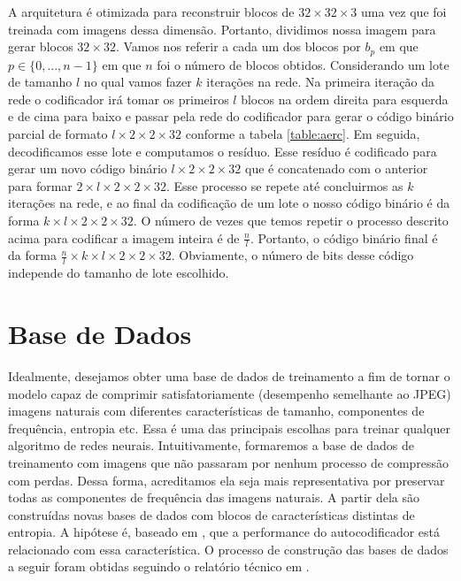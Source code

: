 A arquitetura é otimizada para reconstruir blocos de $32 \times 32 \times 3$ uma vez que foi treinada com imagens dessa dimensão. Portanto, dividimos nossa imagem para gerar blocos $32 \times 32$. Vamos nos referir a cada um dos blocos por $b_p$ em que $p \in \{0,...,n-1\}$ em que $n$ foi o número de blocos obtidos. 
Considerando um lote de tamanho $l$ no qual vamos fazer $k$ iterações na rede.  Na primeira iteração da rede o codificador irá tomar os primeiros $l$ blocos na ordem direita para esquerda e de cima para baixo e passar pela rede do codificador para gerar o código binário parcial de formato $l \times 2 \times 2 \times 32$ conforme a tabela \ref{table:aerc}. Em seguida, decodificamos esse lote e computamos o resíduo. Esse resíduo é codificado para gerar um novo código binário $l \times 2 \times 2 \times 32$ que é concatenado com o anterior para formar $2 \times l \times 2 \times 2 \times 32$. 
Esse processo se repete até concluirmos as $k$ iterações na rede, e ao final da codificação de um lote o nosso código binário é da forma $k \times l \times 2 \times 2 \times 32$. 
O número de vezes que temos repetir o processo descrito acima para codificar a imagem inteira é de $\frac{n}{l}$. Portanto, o código binário final é da forma $\frac{n}{l} \times k \times l \times 2 \times 2 \times 32$. Obviamente, o número de bits desse código independe do tamanho de lote escolhido. 


\section {Base de Dados}

Idealmente, desejamos obter uma base de dados de treinamento a fim de tornar o modelo capaz de comprimir satisfatoriamente (desempenho semelhante ao JPEG) imagens naturais com diferentes características de tamanho, componentes de frequência, entropia etc. Essa é uma das principais escolhas para treinar qualquer algoritmo de redes neurais.  
Intuitivamente, formaremos a base de dados de treinamento com imagens que não passaram por nenhum processo de compressão com perdas. Dessa forma, acreditamos ela seja mais representativa por preservar todas as componentes de frequência das imagens naturais. A partir dela são construídas novas bases de dados com blocos de características distintas de entropia. A hipótese é, baseado em \cite{Variable2016Toderici,FullResolution2017Toderici}, que a performance do autocodificador está relacionado com essa característica. O processo de construção das bases de dados a seguir foram obtidas seguindo o relatório técnico em \cite{DeliverableJuly}.

